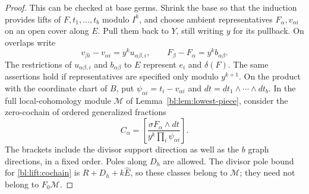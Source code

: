 \begin{proof}
This can be checked at base germs.  Shrink the base so that the induction
provides lifts of \(F,t_1,\ldots,t_b\) modulo \(I^k\), and choose
ambient representatives \(F_\alpha,v_{\alpha i}\) on an open cover
along \(E\).  Pull them back to \(Y\), still writing \(y\) for its
pullback.  On overlaps write
\begin{equation}\label{bl:lift:overlap-functions}
 v_{\beta i}-v_{\alpha i}=y^k u_{\alpha\beta,i},
 \qquad F_\beta-F_\alpha=y^k b_{\alpha\beta}.
\end{equation}
The restrictions of \(u_{\alpha\beta,i}\) and
\(b_{\alpha\beta}\) to \(E\) represent \(e_i\) and \(\delta(F)\).
The same assertions hold if representatives are specified only modulo
\(y^{k+1}\).  On the product with the coordinate chart of \(B\), put
\(\psi_{\alpha i}=t_i-v_{\alpha i}\) and
\(dt=dt_1\wedge\cdots\wedge dt_b\).  In the full local-cohomology
module \(\mathcal M\) of Lemma~\ref{bl:lem:lowest-piece}, consider
the zero-cochain of ordered generalized fractions
\begin{equation}\label{bl:lift:cochain}
 C_\alpha=
 \left[\frac{\sigma F_\alpha\wedge dt}
 {y^k\prod_i\psi_{\alpha i}}\right].
\end{equation}
The brackets include the divisor support direction as well as the
\(b\) graph directions, in a fixed order.  Poles along \(D_h\) are
allowed.  The divisor pole bound for \eqref{bl:lift:cochain} is
\(R+D_h+k\widehat E\), so these classes belong to \(\mathcal M\);
they need not belong to \(F_0\mathcal M\).


\end{proof}
